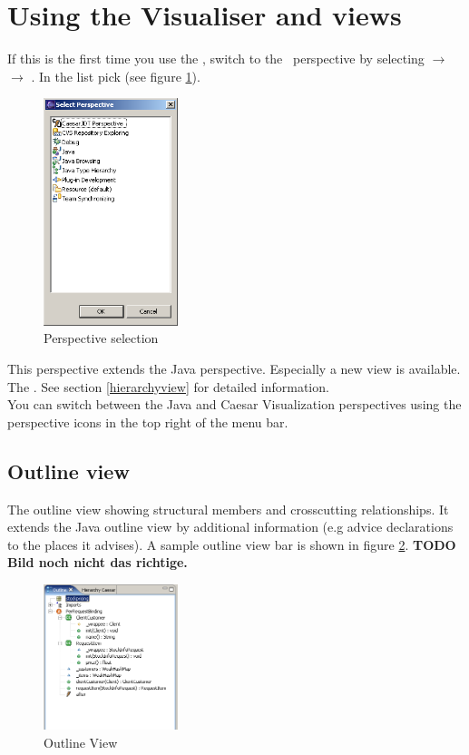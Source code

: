 \section{Using the Visualiser and views}
If this is the first time you use the \cjdt, switch to the \caesarj ~perspective by selecting  $\rightarrow$  $\rightarrow$ . In the list pick  (see figure \ref{fig:select_persp}).

\begin{figure}[htbp]
	\centering
		\includegraphics[width=0.35\textwidth]{images/select_persp.png}
	\caption{Perspective selection}
	\label{fig:select_persp}
\end{figure}

This perspective extends the Java perspective. Especially a new view is available. The . See section \ref{hierarchyview} for detailed information.\\
You can switch between the Java and Caesar Visualization perspectives using the perspective icons in the top right of the menu bar.\\
\subsection{Outline view}
The outline view showing structural members and crosscutting relationships. It extends the Java outline view by additional information (e.g advice declarations to the places it advises). A sample outline view bar is shown in figure \ref{fig:outline_view}. \textbf{TODO Bild noch nicht das richtige.}\\

\begin{figure}[htbp]
	\centering
		\includegraphics[width=0.35\textwidth]{images/outline.png}
	\caption{Outline View}
	\label{fig:outline_view}
\end{figure}

